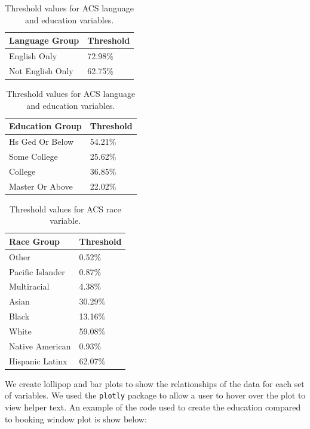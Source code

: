 \documentclass[
  11 pt,
  openany]{book}
\begin{document}
\begin{table}
\caption{\label{tab:thres-tab1}Threshold values for ACS language and education variables.}

\centering
\begin{tabular}[t]{l|l}
\hline
Language Group & Threshold\\
\hline
English Only & 72.98\%\\
\hline
Not English Only & 62.75\%\\
\hline
\end{tabular}
\centering
\begin{tabular}[t]{l|l}
\hline
Education Group & Threshold\\
\hline
Hs Ged Or Below & 54.21\%\\
\hline
Some College & 25.62\%\\
\hline
College & 36.85\%\\
\hline
Master Or Above & 22.02\%\\
\hline
\end{tabular}
\end{table}

\begin{table}

\caption{\label{tab:thres-tab2}Threshold values for ACS race variable.}
\centering
\begin{tabular}[t]{l|l}
\hline
Race Group & Threshold\\
\hline
Other & 0.52\%\\
\hline
Pacific Islander & 0.87\%\\
\hline
Multiracial & 4.38\%\\
\hline
Asian & 30.29\%\\
\hline
Black & 13.16\%\\
\hline
White & 59.08\%\\
\hline
Native American & 0.93\%\\
\hline
Hispanic Latinx & 62.07\%\\
\hline
\end{tabular}
\end{table}

We create lollipop and bar plots to show the relationships of the data for each set of variables. We used the \texttt{plotly} package \citep{R-plotly} to allow a user to hover over the plot to view helper text. An example of the code used to create the education compared to booking window plot is show below:
\end{document}
